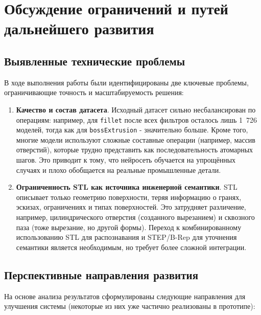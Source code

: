 
\section{Обсуждение ограничений и путей дальнейшего развития}

\subsection{Выявленные технические проблемы}
В ходе выполнения работы были идентифицированы две ключевые проблемы, ограничивающие точность и масштабируемость решения:

\begin{enumerate}
    \item \textbf{Качество и состав датасета}. Исходный датасет сильно несбалансирован по операциям: например, для \texttt{fillet} после всех фильтров осталось лишь 1~726 моделей, тогда как для \texttt{bossExtrusion} - значительно больше. Кроме того, многие модели используют сложные составные операции (например, массив отверстий), которые трудно представить как последовательность атомарных шагов. Это приводит к тому, что нейросеть обучается на упрощённых случаях и плохо обобщается на реальные промышленные детали.

    \item \textbf{Ограниченность STL как источника инженерной семантики}. STL описывает только геометрию поверхности, теряя информацию о гранях, эскизах, ограничениях и типах поверхностей. Это затрудняет различение, например, цилиндрического отверстия (созданного вырезанием) и сквозного паза (тоже вырезание, но другой формы). Переход к комбинированному использованию STL для распознавания и STEP/B-Rep для уточнения семантики является необходимым, но требует более сложной интеграции.
\end{enumerate}

\subsection{Перспективные направления развития}

На основе анализа результатов сформулированы следующие направления для улучшения системы (некоторые из них уже частично реализованы в прототипе):

